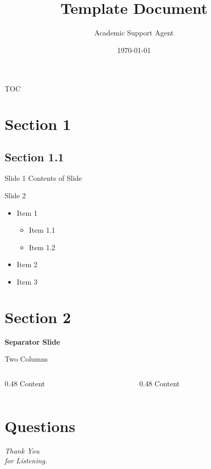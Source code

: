 \documentclass{article}
\title{Template Document}
\author{Academic Support Agent}
\date{\today}
\begin{document}
\maketitle

\begin{frame}
    \titlepage
\end{frame}

\begin{frame}{TOC}
	
\end{frame}

\section{Section 1}
\subsection{Section 1.1}
\begin{frame}{Slide 1}
Contents of Slide 
\end{frame}

\begin{frame}{Slide 2}
\begin{itemize}
    \item Item 1 
        \begin{itemize}
            \item Item 1.1
            \item Item 1.2
        \end{itemize}
    \item Item 2
    \item Item 3 
\end{itemize}
\end{frame}


\section{Section 2}
\begin{frame}{}
    \centering
    \Huge{\textbf{Separator Slide}}
\end{frame}


\begin{frame}{Two Columns}
    \begin{columns}
        \begin{column}{0.48\linewidth}
            Content
        \end{column}
        \begin{column}{0.48\linewidth}
           Content
        \end{column}
    \end{columns}
\end{frame}



\section{Questions}
\begin{frame}
\centering \Huge
\emph{Thank You\\for Listening.}
\end{frame}
\end{document}
